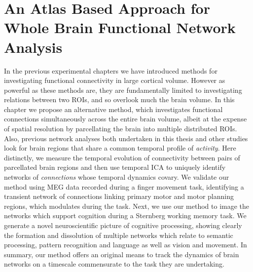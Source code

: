 \chapter{An Atlas Based Approach for Whole Brain Functional Network Analysis}\label{chap_atlas}

In the previous experimental chapters we have introduced methods for investigating functional connectivity in large cortical volume. However as powerful as these methods are, they are fundamentally limited to investigating relations between two ROIs, and so overlook much the brain volume. In this chapter we propose an alternative method, which investigates functional connections simultaneously across the entire brain volume, albeit at the expense of spatial resolution by parcellating the brain into multiple distributed ROIs. Also, previous network analyses both undertaken in this thesis and other studies look for brain regions that share a common temporal profile of \textit{activity}. Here distinctly, we measure the temporal evolution of connectivity between pairs of parcellated brain regions and then use temporal ICA to uniquely identify networks of \textit{connections} whose temporal dynamics covary. We validate our method using MEG data recorded during a finger movement task, identifying a transient network of connections linking primary motor and motor planning regions, which modulates during the task. Next, we use our method to image the networks which support cognition during a Sternberg working memory task. We generate a novel neuroscientific picture of cognitive processing, showing clearly the formation and dissolution of multiple networks which relate to semantic processing, pattern recognition and language as well as vision and movement. In summary, our method offers an original means to track the dynamics of brain networks on a timescale commensurate to the task they are undertaking.

\doublespacing

